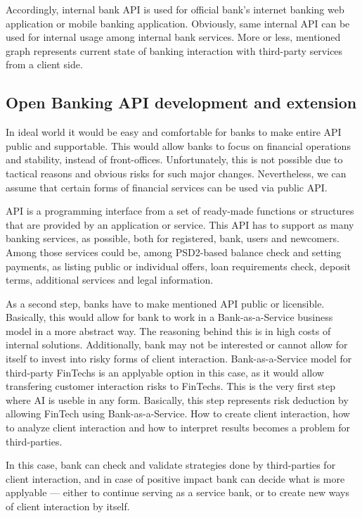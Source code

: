 Accordingly, internal bank API is used for official bank's internet banking web application or mobile banking application. 
Obviously, same internal API can be used for internal usage among internal bank services.
More or less, mentioned graph represents current state of banking interaction with third-party services from a client side.


\subsection{Open Banking API development and extension}

In ideal world it would be easy and comfortable for banks to make entire API public and supportable.
This would allow banks to focus on financial operations and stability, instead of front-offices.
Unfortunately, this is not possible due to tactical reasons and obvious risks for such major changes.
Nevertheless, we can assume that certain forms of financial services can be used via public API.

API is a programming interface from a set of ready-made functions or structures that are provided by an application or service.
This API has to support as many banking services, as possible, both for registered, bank, users and newcomers. 
Among those services could be, among PSD2-based balance check and setting payments, as listing public or individual offers, loan requirements check, deposit terms, additional services and legal information.

As a second step, banks have to make mentioned API public or licensible.
Basically, this would allow for bank to work in a Bank-as-a-Service business model in a more abstract way.
The reasoning behind this is in high costs of internal solutions. 
Additionally, bank may not be interested or cannot allow for itself to invest into risky forms of client interaction.
Bank-as-a-Service model for third-party FinTechs is an applyable option in this case, as it would allow transfering customer interaction risks to FinTechs.
This is the very first step where AI is useble in any form.
Basically, this step represents risk deduction by allowing FinTech using Bank-as-a-Service.
How to create client interaction, how to analyze client interaction and how to interpret results becomes a problem for third-parties.

In this case, bank can check and validate strategies done by third-parties for client interaction, and in case of positive impact bank can decide what is more applyable — either to continue serving as a service bank, or to create new ways of client interaction by itself.

